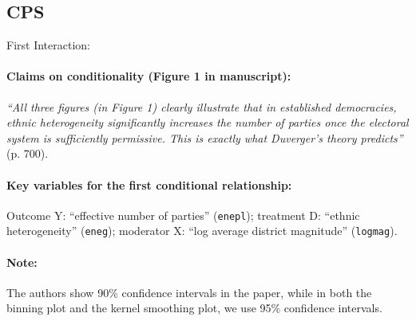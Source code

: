 \documentclass[12pt]{article}
\begin{document}
\subsection{\citet{clark2006rehabilitating} CPS} \label{clark}


\noindent First Interaction:


\paragraph{Claims on conditionality (Figure 1 in manuscript):} \emph{``All three
  figures (in Figure 1) clearly illustrate that in established democracies, ethnic
  heterogeneity significantly increases the number of parties once the
  electoral system is sufficiently permissive. This is exactly what
  Duverger's theory predicts''} (p. 700).


\paragraph{Key variables for the first conditional relationship:} Outcome Y:
``effective number of parties'' 
(\texttt{enepl}); treatment D:  ``ethnic
heterogeneity'' (\texttt{eneg}); moderator X: ``log average district magnitude'' (\texttt{logmag}). 

\paragraph{Note:} The authors show 90\% confidence intervals in the paper, while in both the binning plot and the kernel smoothing plot, we use 95\% confidence intervals.

\clearpage
\end{document}
